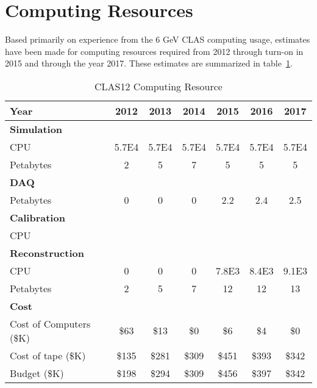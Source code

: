 \section{Computing Resources}

Based primarily on experience from the 6 GeV CLAS computing usage, estimates have been made for computing resources required from 2012 through turn-on in 2015 and through the year 2017.  These estimates are summarized in table~\ref{tab:Compute}. 

\begin{table}[htdp]
\caption{CLAS12 Computing Resource}
\begin{center}
\begin{tabular}{|l|c|c|c|c|c|c|}
\hline 
{\bf Year}  & 2012 & 2013 & 2014 & 2015 & 2016 & 2017  \\  \hline
{\bf Simulation} & & & & & & \\
CPU & 5.7E4 & 5.7E4 & 5.7E4 & 5.7E4 & 5.7E4 & 5.7E4 \\
Petabytes & 2 & 5 & 7 & 5 & 5 & 5 \\ \hline
{\bf DAQ }& & & & & & \\
Petabytes & 0 & 0 & 0  & 2.2 & 2.4 & 2.5 \\ \hline
{\bf Calibration}  & & & & & & \\
CPU & & & & & & \\ \hline
{\bf Reconstruction} & & & & & & \\
CPU & 0 & 0 & 0 & 7.8E3 & 8.4E3 & 9.1E3 \\
Petabytes & 2 & 5 & 7 & 12 & 12 & 13 \\ \hline
{\bf Cost} & & & & & & \\
Cost of Computers (\$K) & \$63 & \$13 & \$0 & \$6 & \$4 & \$0 \\
Cost of tape (\$K) & \$135 & \$281 & \$309 & \$451 & \$393 & \$342 \\
Budget (\$K) & \$198 & \$294 & \$309 & \$456 & \$397 & \$342 \\
\hline
\end{tabular}
\end{center}
\label{tab:Compute}
\end{table}

